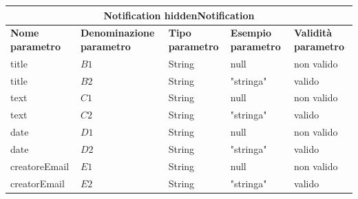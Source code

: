 \begin{table}[H]
    \centering
    \begin{tabular}{|p{2cm}|p{3cm}|p{2cm}|p{2cm}|p{2cm}|}
      \hline
      \multicolumn{5}{|c|}{Notification hiddenNotification}\\
      \hline
      \rowcolor{green!10}
      \textbf{Nome parametro} & \textbf{Denominazione parametro} & \textbf{Tipo parametro} & \textbf{Esempio parametro} & \textbf{Validità parametro} \\
      \hline
      \rowcolor{black!10}
      title                   & $B1$                             & String                  & null                       & non valido                  \\
      title                   & $B2$                             & String                  & "stringa"                  & valido                      \\
      \hline
      \rowcolor{black!10}
      text                    & $C1$                             & String                  & null                       & non valido                  \\
      text                    & $C2$                             & String                  & "stringa"                  & valido                      \\
      \hline
      \rowcolor{black!10}
      date                    & $D1$                             & String                  & null                       & non valido                  \\
      date                    & $D2$                             & String                  & "stringa"                  & valido                      \\
      \hline
      \rowcolor{black!10}
      creatoreEmail           & $E1$                             & String                  & null                       & non valido                  \\
      creatorEmail            & $E2$                             & String                  & "stringa"                  & valido                      \\
      \hline
    \end{tabular}
  \end{table}
  
